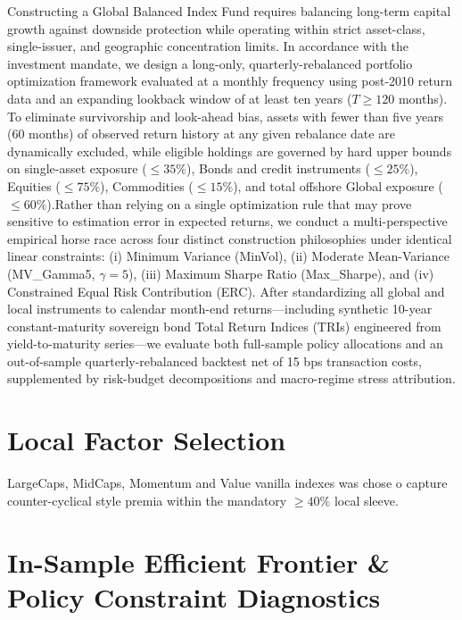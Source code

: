 \documentclass[11pt,preprint]{elsarticle}
\numberwithin{equation}{section}
\numberwithin{figure}{section}
\numberwithin{table}{section}
\begin{document}
Constructing a Global Balanced Index Fund requires balancing long-term
capital growth against downside protection while operating within strict
asset-class, single-issuer, and geographic concentration limits. In
accordance with the investment mandate, we design a long-only,
quarterly-rebalanced portfolio optimization framework evaluated at a
monthly frequency using post-2010 return data and an expanding lookback
window of at least ten years (\(T \ge 120\) months). To eliminate
survivorship and look-ahead bias, assets with fewer than five years (60
months) of observed return history at any given rebalance date are
dynamically excluded, while eligible holdings are governed by hard upper
bounds on single-asset exposure (\(\le 35\%\)), Bonds and credit
instruments (\(\le 25\%\)), Equities (\(\le 75\%\)), Commodities
(\(\le 15\%\)), and total offshore Global exposure (\(\le 60\%\)).Rather
than relying on a single optimization rule that may prove sensitive to
estimation error in expected returns, we conduct a multi-perspective
empirical horse race across four distinct construction philosophies
under identical linear constraints: (i) Minimum Variance (MinVol), (ii)
Moderate Mean-Variance (MV\_Gamma5, \(\gamma = 5\)), (iii) Maximum
Sharpe Ratio (Max\_Sharpe), and (iv) Constrained Equal Risk Contribution
(ERC). After standardizing all global and local instruments to calendar
month-end returns---including synthetic 10-year constant-maturity
sovereign bond Total Return Indices (TRIs) engineered from
yield-to-maturity series---we evaluate both full-sample policy
allocations and an out-of-sample quarterly-rebalanced backtest net of 15
bps transaction costs, supplemented by risk-budget decompositions and
macro-regime stress attribution.

\section{Local Factor Selection}\label{local-factor-selection}

LargeCaps, MidCaps, Momentum and Value vanilla indexes was chose o
capture counter-cyclical style premia within the mandatory \(\ge 40\%\)
local sleeve.

\section{In-Sample Efficient Frontier \& Policy Constraint
Diagnostics}\label{in-sample-efficient-frontier-policy-constraint-diagnostics}
\end{document}
